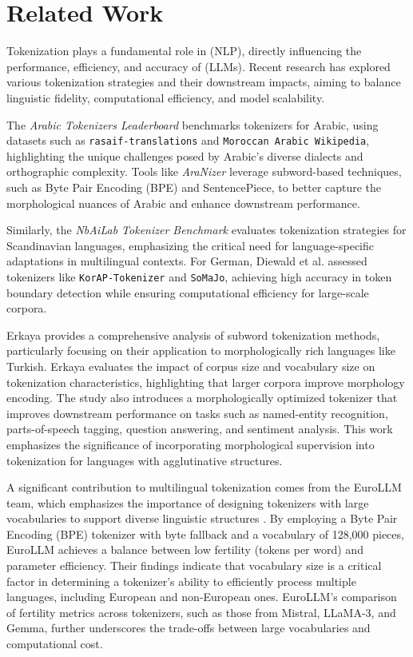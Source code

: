 \section{Related Work}
Tokenization plays a fundamental role in (NLP), directly influencing the performance, efficiency, and accuracy of (LLMs). Recent research has explored various tokenization strategies and their downstream impacts, aiming to balance linguistic fidelity, computational efficiency, and model scalability.

The \textit{Arabic Tokenizers Leaderboard} \cite{rashad_arabic_nodate} benchmarks tokenizers for Arabic, using datasets such as \texttt{rasaif-translations} and \texttt{Moroccan Arabic Wikipedia}, highlighting the unique challenges posed by Arabic's diverse dialects and orthographic complexity. Tools like \textit{AraNizer} \cite{koubaa_githubcomriotu-labaranizer_2024} leverage subword-based techniques, such as Byte Pair Encoding (BPE) and SentencePiece, to better capture the morphological nuances of Arabic and enhance downstream performance.

Similarly, the \textit{NbAiLab Tokenizer Benchmark} \cite{rosa_nbailabtokenizer-benchmark_2024} evaluates tokenization strategies for Scandinavian languages, emphasizing the critical need for language-specific adaptations in multilingual contexts. For German, Diewald et al. \cite{diewald_tokenizing_2022} assessed tokenizers like \texttt{KorAP-Tokenizer} and \texttt{SoMaJo}, achieving high accuracy in token boundary detection while ensuring computational efficiency for large-scale corpora.

Erkaya \cite{erkaya_analysis_2023} provides a comprehensive analysis of subword tokenization methods, particularly focusing on their application to morphologically rich languages like Turkish. Erkaya evaluates the impact of corpus size and vocabulary size on tokenization characteristics, highlighting that larger corpora improve morphology encoding. The study also introduces a morphologically optimized tokenizer that improves downstream performance on tasks such as named-entity recognition, parts-of-speech tagging, question answering, and sentiment analysis. This work emphasizes the significance of incorporating morphological supervision into tokenization for languages with agglutinative structures.

A significant contribution to multilingual tokenization comes from the EuroLLM team, which emphasizes the importance of designing tokenizers with large vocabularies to support diverse linguistic structures \cite{martins_eurollm_2024}. By employing a Byte Pair Encoding (BPE) tokenizer with byte fallback and a vocabulary of 128,000 pieces, EuroLLM achieves a balance between low fertility (tokens per word) and parameter efficiency. Their findings indicate that vocabulary size is a critical factor in determining a tokenizer’s ability to efficiently process multiple languages, including European and non-European ones. EuroLLM's comparison of fertility metrics across tokenizers, such as those from Mistral, LLaMA-3, and Gemma, further underscores the trade-offs between large vocabularies and computational cost.

